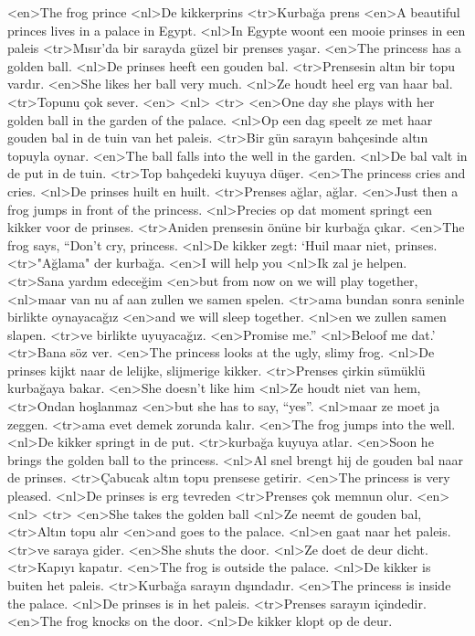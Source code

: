 <en>The frog prince
<nl>De kikkerprins
<tr>Kurbağa prens
<en>A beautiful princes lives in a palace in Egypt.
<nl>In Egypte woont een mooie prinses in een paleis 
<tr>Mısır'da bir sarayda güzel bir prenses yaşar.
<en>The princess has a golden ball.
<nl>De prinses heeft een gouden bal.
<tr>Prensesin altın bir topu vardır.
<en>She likes her ball very much.
<nl>Ze houdt heel erg van haar bal.
<tr>Topunu çok sever.
<en>
<nl>
<tr>
<en>One day she plays with her golden ball in the garden of the palace.
<nl>Op een dag speelt ze met haar gouden bal in de tuin van het paleis.
<tr>Bir gün sarayın bahçesinde altın topuyla oynar.
<en>The ball falls into the well in the garden.
<nl>De bal valt in de put in de tuin.
<tr>Top bahçedeki kuyuya düşer.
<en>The princess cries and cries.
<nl>De prinses huilt en huilt.
<tr>Prenses ağlar, ağlar.
<en>Just then a frog jumps in front of the princess.
<nl>Precies op dat moment springt een kikker voor de prinses.
<tr>Aniden prensesin önüne bir kurbağa çıkar.
<en>The frog says, “Don’t cry, princess.
<nl>De kikker zegt: `Huil maar niet, prinses.
<tr>"Ağlama" der kurbağa.
<en>I will help you
<nl>Ik zal je helpen.
<tr>Sana yardım edeceğim
<en>but from now on we will play together, 
<nl>maar van nu af aan zullen we samen spelen. 
<tr>ama bundan sonra seninle birlikte oynayacağız
<en>and we will sleep together.
<nl>en we zullen samen slapen.
<tr>ve birlikte uyuyacağız.
<en>Promise me.”
<nl>Beloof me dat.'
<tr>Bana söz ver.
<en>The princess looks at the ugly, slimy frog.
<nl>De prinses kijkt naar de lelijke, slijmerige kikker.
<tr>Prenses çirkin sümüklü kurbağaya bakar.
<en>She doesn’t like him
<nl>Ze houdt niet van hem,
<tr>Ondan hoşlanmaz
<en>but she has to say, “yes”.
<nl>maar ze moet ja zeggen.
<tr>ama evet demek zorunda kalır.
<en>The frog jumps into the well.
<nl>De kikker springt in de put.
<tr>kurbağa kuyuya atlar.
<en>Soon he brings the golden ball to the princess.
<nl>Al snel brengt hij de gouden bal naar de prinses.
<tr>Çabucak altın topu prensese getirir.
<en>The princess is very pleased.
<nl>De prinses is erg tevreden
<tr>Prenses çok memnun olur.
<en>
<nl>
<tr>
<en>She takes the golden ball
<nl>Ze neemt de gouden bal,
<tr>Altın topu alır
<en>and goes to the palace.
<nl>en gaat naar het paleis.
<tr>ve saraya gider.
<en>She shuts the door.
<nl>Ze doet de deur dicht.
<tr>Kapıyı kapatır.
<en>The frog is outside the palace.
<nl>De kikker is buiten het paleis.
<tr>Kurbağa sarayın dışındadır.
<en>The princess is inside the palace.
<nl>De prinses is in het paleis.
<tr>Prenses sarayın içindedir.
<en>The frog knocks on the door.
<nl>De kikker klopt op de deur.
